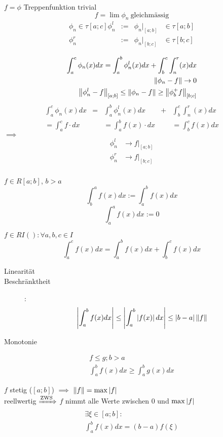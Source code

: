 \begin{Bew}
  $f=\phi$ Treppenfunktion trivial
  \[f=\lim\phi_n\ \text{gleichmässig}\]
  \begin{align*}
    \phi_n\in \tau[a;c]
    \phi_n^l &:=& \phi_n|_{[a;b]}&\in\tau[a;b]\\
    \phi_n^r &:=& \phi_n|_{[b;c]}&\in\tau[b;c]\\
  \end{align*}
  \begin{align*}
    \int^c_a\phi_n(x)dx = \int^b_a\phi_n^l(x)dx+\int^c_b \int^r_n(x)dx\\
    \left\| \phi_n-f \right\|\to0\\
    \left\| \phi_n^l-f \right\|_{[a;b]}\leq \left\| \phi_n-f \right\|\geq \left\| \phi_b^+f \right\|_{[b;c]}
  \end{align*}
  \begin{align*}
    \int^c_a\phi_n(x)dx &=& \int^b_a\phi_n^l(x)dx&+&\int^c_b \int^r_n(x)dx\\
    =\int^c_a f \cdot dx & &=\int^b_a f(x) \cdot dx & & =\int^c_b f(x) dx
  \end{align*}
  $\implies$
  \begin{align*}
    \phi_n^l&\to f|_{[a;b]}\\
    \phi_n^r&\to f|_{[b;c]}\\
  \end{align*}
\end{Bew}
\begin{Def}
  $f\in R[a;b]$, $b>a$
  \[\int^a_bf(x)dx := \int^b_af(x)dx\]
  \[\int^a_af(x)dx := 0 \]
\end{Def}
\begin{Sat}
  $f\in RI(): \forall a,b,c \in I$
  \[\int^c_af(x)dx = \int^b_af(x)dx + \int^c_bf(x)dx\]
\end{Sat}
\begin{Bem}
  \begin{description}
    \item[Linearität]
    \item[Beschränktheit]: \[\left| \int^b_af(x)dx \right|\leq \left| \int^b_a\left| f(x) \right|dx \right|\leq \left| b-a \right|\left\| f \right\|\]
    \item[Monotonie]
  \end{description}
  \begin{align*}
    f\leq g; b>a\\
    \int^b_a f(x)dx \geq \int^b_ag(x)dx
  \end{align*}
\end{Bem}
\begin{Bem}
  $f$ stetig ($[a;b]$) $\implies$ $\left\| f \right\| = \max\left| f \right|$\\
  reellwertig $\xRightarrow{\text{ZWS}}$ $f$ nimmt alle Werte zwischen $0$ und $\max\left| f \right|$ %
  \begin{align*}
    \exists\xi\in [a;b]:\\
    \int^b_af(x)dx=(b-a)f(\xi)
  \end{align*}
\end{Bem}
